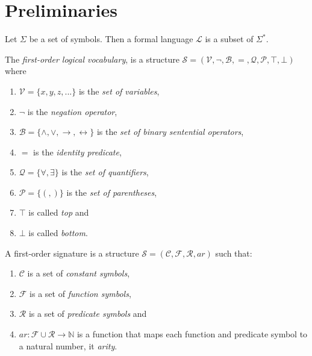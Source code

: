 \chapter{Preliminaries}

\begin{definition} \label{def:formal-language}
    Let $\Sigma$ be a set of symbols. Then a formal language $\mathcal{L}$ is a subset of $\Sigma^*$.
\end{definition}

\begin{definition}\label{def:FO-logical-vocab}
    The \textit{first-order logical vocabulary}, is a structure $\mathcal{S} = (\mathcal{V},\neg,\mathcal{B},=,\mathcal{Q},\mathcal{P}, \top, \bot)$ where
    \begin{enumerate}
        \item $\mathcal{V} = \{x,y,z,...\}$ is the \textit{set of variables},
        \item $\neg$ is the \textit{negation operator},
        \item $\mathcal{B} = \{\land,\lor,\to,\leftrightarrow\}$ is the \textit{set of binary sentential operators},
        \item $=$ is the \textit{identity predicate},
        \item $\mathcal{Q} = \{\forall, \exists\}$ is the \textit{set of quantifiers},
        \item $\mathcal{P} = \{(,)\}$ is the \textit{set of parentheses},
        \item $\top$ is called \textit{top} and
        \item $\bot$ is called \textit{bottom}.
    \end{enumerate}
\end{definition}

\begin{definition}\label{def:FO-signature}
    A first-order signature is a structure $\mathcal{S} = (\mathcal{C},\mathcal{F},\mathcal{R},ar)$ such that:
    \begin{enumerate}
        \item $\mathcal{C}$ is a set of \textit{constant symbols},
        \item $\mathcal{F}$ is a set of \textit{function symbols},
        \item $\mathcal{R}$ is a set of \textit{predicate symbols} and
        \item $ar : \mathcal{F} \cup \mathcal{R} \to \mathbb{N}$ is a function that maps each function and predicate symbol to a natural number, it \textit{arity}.
    \end{enumerate}
\end{definition}

